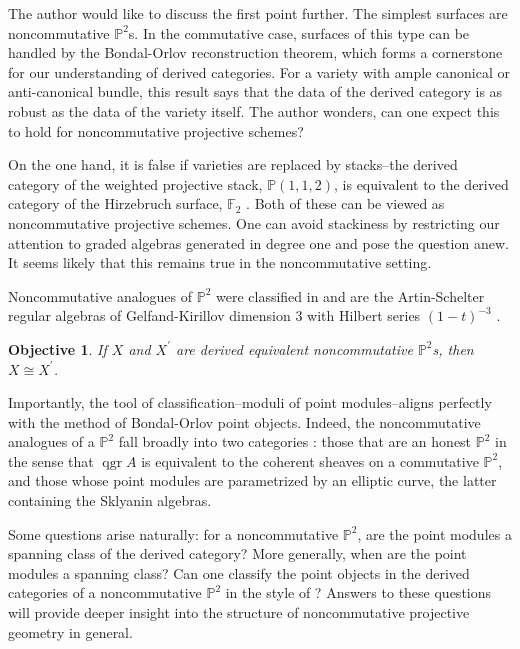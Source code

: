 \documentclass[11pt]{amsart}
\newtheorem{objective}{Objective}
\begin{document}
The author would like to discuss the first point further.
The simplest surfaces are noncommutative $\mathbb{P}^2$s.
In the commutative case, surfaces of this type can be handled by the Bondal-Orlov reconstruction theorem, which forms a cornerstone for our understanding of derived categories.
For a variety with ample canonical or anti-canonical bundle, this result says that the data of the derived category is as robust as the data of the variety itself.
The author wonders, can one expect this to hold for noncommutative projective schemes?

On the one hand, it is false if varieties are replaced by stacks--the derived category of the weighted projective stack, $\mathbb{P}(1,1,2)$, is equivalent to the derived category of the Hirzebruch surface, $\mathbb{F}_2$ \cite{BF12}.
Both of these can be viewed as noncommutative projective schemes.
One can avoid stackiness by restricting our attention to graded algebras generated in degree one and pose the question anew.
It seems likely that this remains true in the noncommutative setting.

Noncommutative analogues of $\mathbb{P}^2$ were classified in \cite{ATV,Stephenson96,Stephenson97} and are the Artin-Schelter regular algebras \cite{AS87} of Gelfand-Kirillov dimension 3 with Hilbert series $(1-t)^{-3}$ \cite[Section 11]{SVdB01}.
\begin{tcolorbox}\begin{objective}
    If $X$ and $X^\prime$ are derived equivalent noncommutative $\mathbb{P}^2$s, then $X \cong X^\prime$.
  \end{objective}
\end{tcolorbox}

Importantly, the tool of classification--moduli of point modules--aligns perfectly with the method of Bondal-Orlov point objects.
Indeed, the noncommutative analogues of a $\mathbb{P}^2$ fall broadly into two categories \cite{Stafford02}: those that are an honest $\mathbb{P}^2$ in the sense that $\operatorname{qgr} A$ is equivalent to the coherent sheaves on a commutative $\mathbb{P}^2$, and those whose point modules are parametrized by an elliptic curve, the latter containing the Sklyanin algebras.

Some questions arise naturally: for a noncommutative $\mathbb{P}^2$, are the point modules a spanning class of the derived category?
More generally, when are the point modules a spanning class?
Can one classify the point objects in the derived categories of a noncommutative $\mathbb{P}^2$ in the style of \cite{Bondal-Orlov}?
Answers to these questions will provide deeper insight into the structure of noncommutative projective geometry in general.
\end{document}
